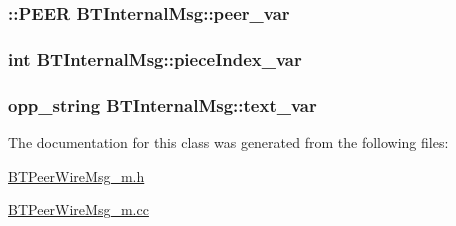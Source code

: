 \subsubsection[{peer\+\_\+var}]{\setlength{\rightskip}{0pt plus 5cm}\+::{\bf P\+E\+E\+R} B\+T\+Internal\+Msg\+::peer\+\_\+var\hspace{0.3cm}{\ttfamily [protected]}}\label{classBTInternalMsg_aedc6acce926c31ae1d032110de29e871}
\hypertarget{classBTInternalMsg_a74c9e0793d23162bc836a76b78812d88}{}
\subsubsection[{piece\+Index\+\_\+var}]{\setlength{\rightskip}{0pt plus 5cm}int B\+T\+Internal\+Msg\+::piece\+Index\+\_\+var\hspace{0.3cm}{\ttfamily [protected]}}\label{classBTInternalMsg_a74c9e0793d23162bc836a76b78812d88}
\hypertarget{classBTInternalMsg_a8c02d34494805be9a533ffd978c02420}{}
\subsubsection[{text\+\_\+var}]{\setlength{\rightskip}{0pt plus 5cm}opp\+\_\+string B\+T\+Internal\+Msg\+::text\+\_\+var\hspace{0.3cm}{\ttfamily [protected]}}\label{classBTInternalMsg_a8c02d34494805be9a533ffd978c02420}


The documentation for this class was generated from the following files\+:\begin{DoxyCompactItemize}
\item 
\hyperlink{BTPeerWireMsg__m_8h}{B\+T\+Peer\+Wire\+Msg\+\_\+m.\+h}\item 
\hyperlink{BTPeerWireMsg__m_8cc}{B\+T\+Peer\+Wire\+Msg\+\_\+m.\+cc}\end{DoxyCompactItemize}
